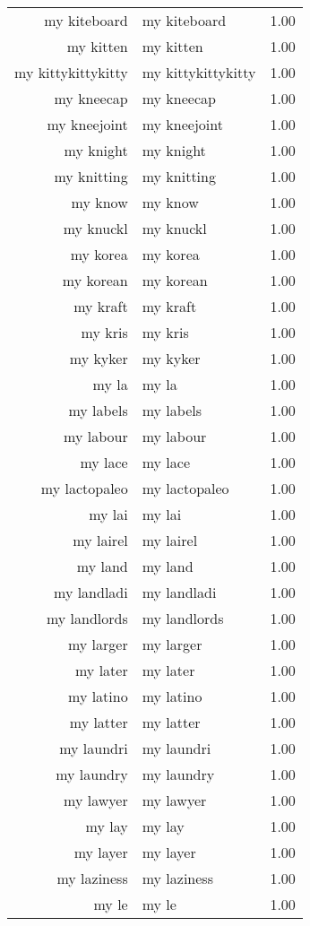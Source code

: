 \begin{table}[ht]
\begin{tabular}{rlr}
  my kiteboard & my kiteboard & 1.00 \\ 
  my kitten & my kitten & 1.00 \\ 
  my kittykittykitty & my kittykittykitty & 1.00 \\ 
  my kneecap & my kneecap & 1.00 \\ 
  my kneejoint & my kneejoint & 1.00 \\ 
  my knight & my knight & 1.00 \\ 
  my knitting & my knitting & 1.00 \\ 
  my know & my know & 1.00 \\ 
  my knuckl & my knuckl & 1.00 \\ 
  my korea & my korea & 1.00 \\ 
  my korean & my korean & 1.00 \\ 
  my kraft & my kraft & 1.00 \\ 
  my kris & my kris & 1.00 \\ 
  my kyker & my kyker & 1.00 \\ 
  my la & my la & 1.00 \\ 
  my labels & my labels & 1.00 \\ 
  my labour & my labour & 1.00 \\ 
  my lace & my lace & 1.00 \\ 
  my lactopaleo & my lactopaleo & 1.00 \\ 
  my lai & my lai & 1.00 \\ 
  my lairel & my lairel & 1.00 \\ 
  my land & my land & 1.00 \\ 
  my landladi & my landladi & 1.00 \\ 
  my landlords & my landlords & 1.00 \\ 
  my larger & my larger & 1.00 \\ 
  my later & my later & 1.00 \\ 
  my latino & my latino & 1.00 \\ 
  my latter & my latter & 1.00 \\ 
  my laundri & my laundri & 1.00 \\ 
  my laundry & my laundry & 1.00 \\ 
  my lawyer & my lawyer & 1.00 \\ 
  my lay & my lay & 1.00 \\ 
  my layer & my layer & 1.00 \\ 
  my laziness & my laziness & 1.00 \\ 
  my le & my le & 1.00 \\ 

\end{tabular}
\end{table}
